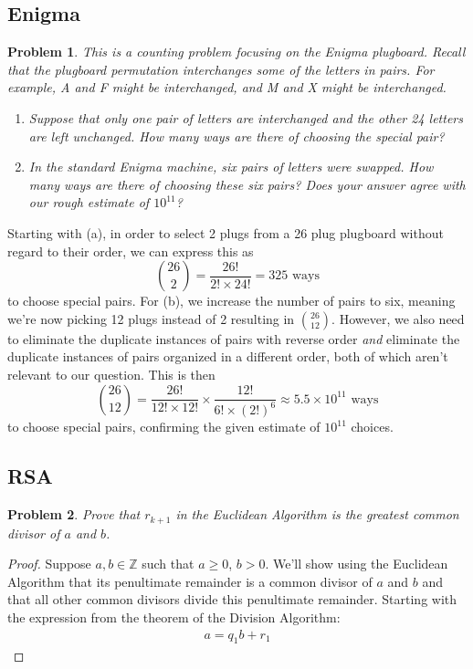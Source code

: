 \documentclass[12pt]{article}
\newtheorem{problem}{Problem}
\theoremstyle{remark}  %
\begin{document}
\subsection{Enigma}

    \begin{problem}
            This is a counting problem focusing on the Enigma plugboard. Recall that the plugboard permutation interchanges some of the letters in pairs. For example, A and F might be interchanged, and M and X might be interchanged.
            \begin{enumerate}[label=(\alph*)]
                \item Suppose that only one pair of letters are interchanged and the other 24 letters are left unchanged. How many ways are there of choosing the special pair?
                \item In the standard Enigma machine, six pairs of letters were swapped. How many ways are there of choosing these six pairs? Does your answer agree with our rough estimate of $10^{11}$?
            \end{enumerate}
    \end{problem}
    Starting with (a), in order to select 2 plugs from a 26 plug plugboard without regard to their order, we can express this as $${26\choose2} =\frac{26!}{2!\times24!}=325\text{ ways}$$ to choose special pairs. For (b), we increase the number of pairs to six, meaning we're now picking 12 plugs instead of 2 resulting in ${26\choose12}$. However, we also need to eliminate the duplicate instances of pairs with reverse order \emph{and} eliminate the duplicate instances of pairs organized in a different order, both of which aren't relevant to our question. This is then $${26\choose12} = \frac{26!}{12!\times 12!} \times \frac{12!}{6!\times(2!)^6}\approx5.5\times10^{11}\text{ ways}$$ to choose special pairs, confirming the given estimate of $10^{11}$ choices.

\setcounter{subsection}{8}
\subsection{RSA}

    \setcounter{problem}{2}
    \begin{problem}
        Prove that $r_{k+1}$ in the Euclidean Algorithm is the greatest common divisor of $a$ and $b$.
    \end{problem}
    \begin{proof}
        Suppose $a,b\in\mathbb{Z}$ such that $a\geq 0$, $b>0$. We'll show using the Euclidean Algorithm that its penultimate remainder is a common divisor of $a$ and $b$ and that all other common divisors divide this penultimate remainder. Starting with the expression from the theorem of the Division Algorithm:
        \begin{align*}
            a=q_1b+r_1
        \end{align*}
    \end{proof}
\end{document}
